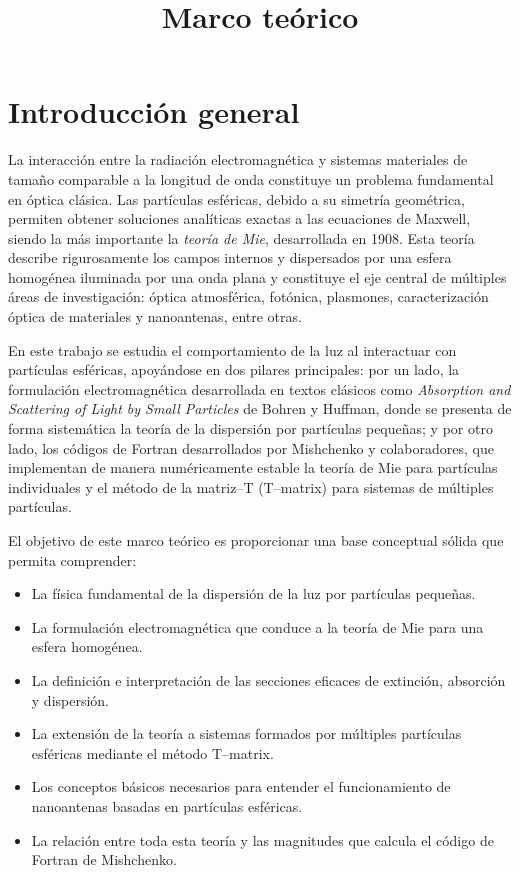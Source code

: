 \documentclass[12pt,a4paper]{article}
\title{Marco teórico}
\author{}
\date{}
\begin{document}
\maketitle

\section{Introducción general}

La interacción entre la radiación electromagnética y sistemas materiales de tamaño comparable a la longitud de onda constituye un problema fundamental en óptica clásica.
Las partículas esféricas, debido a su simetría geométrica, permiten obtener soluciones analíticas exactas a las ecuaciones de Maxwell, siendo la más importante la
\emph{teoría de Mie}, desarrollada en 1908.
Esta teoría describe rigurosamente los campos internos y dispersados por una esfera homogénea iluminada por una onda plana y constituye el eje central de múltiples áreas
de investigación: óptica atmosférica, fotónica, plasmones, caracterización óptica de materiales y nanoantenas, entre otras.

En este trabajo se estudia el comportamiento de la luz al interactuar con partículas esféricas, apoyándose en dos pilares principales: por un lado, la formulación
electromagnética desarrollada en textos clásicos como \emph{Absorption and Scattering of Light by Small Particles} de Bohren y Huffman, donde se presenta de forma sistemática
la teoría de la dispersión por partículas pequeñas; y por otro lado, los códigos de Fortran desarrollados por Mishchenko y colaboradores, que implementan de manera numéricamente
estable la teoría de Mie para partículas individuales y el método de la matriz--T (T--matrix) para sistemas de múltiples partículas.

El objetivo de este marco teórico es proporcionar una base conceptual sólida que permita comprender:

\begin{itemize}
  \item La física fundamental de la dispersión de la luz por partículas pequeñas.
  \item La formulación electromagnética que conduce a la teoría de Mie para una esfera homogénea.
  \item La definición e interpretación de las secciones eficaces de extinción, absorción y dispersión.
  \item La extensión de la teoría a sistemas formados por múltiples partículas esféricas mediante el método T--matrix.
  \item Los conceptos básicos necesarios para entender el funcionamiento de nanoantenas basadas en partículas esféricas.
  \item La relación entre toda esta teoría y las magnitudes que calcula el código de Fortran de Mishchenko.
\end{itemize}
\end{document}
